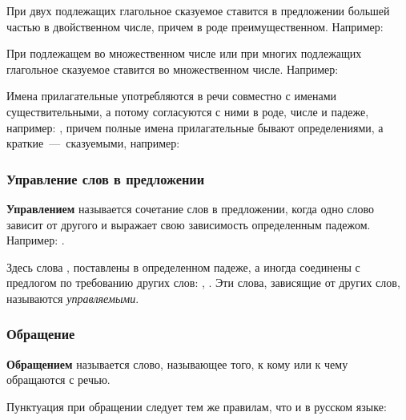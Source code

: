 \documentclass[11pt,a4paper,oneside]{memoir}
\begin{document}
    \bigskip{}

    При двух подлежащих глагольное сказуемое ставится в предложении большей частью в двойственном числе, причем в роде преимущественном. Например:
    
    \medskip{}

    При подлежащем во множественном числе или при многих подлежащих глагольное сказуемое ставится во множественном числе. Например:
        
    \bigskip{}

    Имена прилагательные употребляются в речи совместно с именами существительными, а потому согласуются с ними в роде, числе и падеже, например: {}, причем полные имена прилагательные бывают определениями, а краткие~---~сказуемыми, например:
        
    \bigskip{}

                \subsubsection{Управление слов в предложении}

    \textbf{Управлением} называется сочетание слов в предложении, когда одно слово зависит от другого и выражает свою зависимость определенным падежом. Например: {}.
    
    Здесь слова {}, {} поставлены в определенном падеже, а иногда соединены с предлогом по требованию других слов: {}, {}. Эти слова, зависящие от других слов, называются \emph{управляемыми}.

                \subsubsection{Обращение}

    \textbf{Обращением} называется слово, называющее того, к кому или к чему обращаются с речью.
    
    Пунктуация при обращении следует тем же правилам, что и в русском языке:
    
\end{document}
